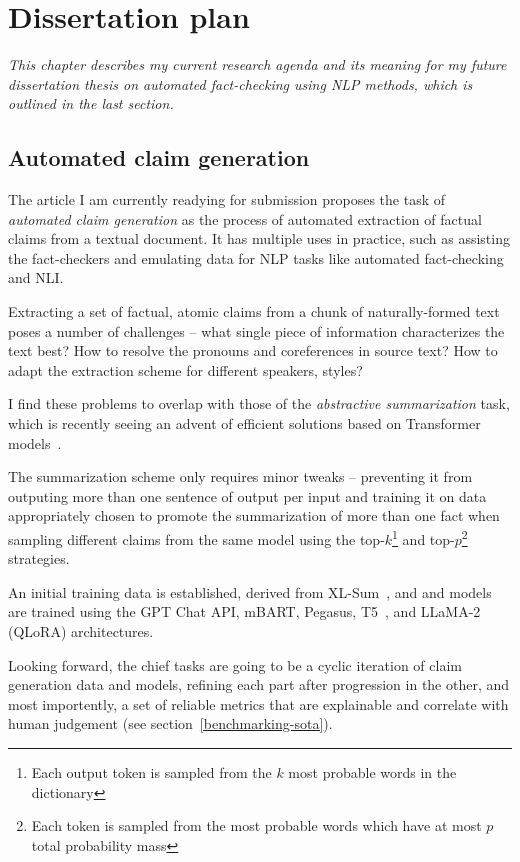 
\chapter{Dissertation plan}
\label{chap:plan}
\textit{This chapter describes my current research agenda and its meaning for my future dissertation thesis on automated fact-checking using NLP methods, which is outlined in the last section.}

\section{Automated claim generation}
\label{generation}

The article I am currently readying for submission proposes the task of \textit{automated claim generation} as the process of automated extraction of factual claims from a textual document. It has multiple uses in practice, such as assisting the fact-checkers and emulating data for NLP tasks like automated fact-checking and NLI.

Extracting a set of factual, atomic claims from a chunk of naturally-formed text poses a number of challenges -- what single piece of information characterizes the text best? 
How to resolve the pronouns and coreferences in source text?
How to adapt the extraction scheme for different speakers, styles?

I find these problems to overlap with those of the \textit{abstractive summarization} task, which is recently seeing an advent of efficient solutions based on Transformer models~\cite{pegasus,brio}.

The summarization scheme only requires minor tweaks -- preventing it from outputing more than one sentence of output per input and training it on data appropriately chosen to promote the summarization of more than one fact when sampling different claims from the same model using the top-$k$\footnote{Each output token is sampled from the $k$ most probable words in the dictionary} and top-$p$\footnote{Each token is sampled from the most probable words which have at most $p$ total probability mass}~\cite{topp} strategies.

An initial training data is established, derived from XL-Sum~\cite{xlsum}, \FEN and \CTK and models are trained using the GPT Chat API, mBART, Pegasus, T5~\cite{t5-11b}, and LLaMA-2 (QLoRA) architectures.

Looking forward, the chief tasks are going to be a cyclic iteration of claim generation data and models, refining each part after progression in the other, and most importently, a set of reliable metrics that are explainable and correlate with human judgement (see section~\ref{benchmarking-sota}).

